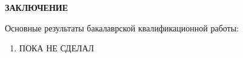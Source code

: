 \newpage
\begin{center}
  \textbf{\large ЗАКЛЮЧЕНИЕ}
\end{center}


Основные результаты бакалаврской квалификационной работы:
\begin{enumerate}
\item ПОКА НЕ СДЕЛАЛ
\end{enumerate}
